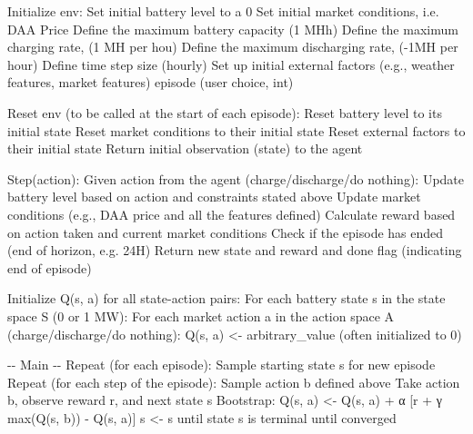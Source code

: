 \documentclass[11pt]{article}
\newenvironment{Shaded}{}{}
\newcommand{\NormalTok}[1]{{#1}}
\begin{document}
\begin{Shaded}
\begin{Highlighting}[]
\NormalTok{Initialize env:}
\NormalTok{    Set initial battery level to a 0}
\NormalTok{    Set initial market conditions, i.e. DAA Price}
\NormalTok{    Define the maximum battery capacity (1 MHh)}
\NormalTok{    Define the maximum charging rate, (1 MH per hou)}
\NormalTok{    Define the maximum discharging rate, ({-}1MH per hour)}
\NormalTok{    Define time step size (hourly)}
\NormalTok{    Set up initial external factors (e.g., weather features, market features)}
\NormalTok{    episode (user choice, int)}

\NormalTok{Reset env (to be called at the start of each episode): }
\NormalTok{    Reset battery level to its initial state}
\NormalTok{    Reset market conditions to their initial state}
\NormalTok{    Reset external factors to their initial state}
\NormalTok{    Return initial observation (state) to the agent}

\NormalTok{Step(action):}
\NormalTok{    Given action from the agent (charge/discharge/do nothing):}
\NormalTok{        Update battery level based on action and constraints stated above}
\NormalTok{        Update market conditions (e.g., DAA price and all the features defined)}
\NormalTok{        Calculate reward based on action taken and current market conditions}
\NormalTok{        Check if the episode has ended (end of horizon, e.g. 24H)}
\NormalTok{        Return new state and reward and done flag (indicating end of episode)}

\NormalTok{Initialize Q(s, a) for all state{-}action pairs:}
\NormalTok{    For each battery state s in the state space S (0 or 1 MW):}
\NormalTok{        For each market action a in the action space A (charge/discharge/do nothing):}
\NormalTok{            Q(s, a) \textless{}{-} arbitrary\_value (often initialized to 0)}

\NormalTok{{-}{-} Main {-}{-}}
\NormalTok{Repeat (for each episode):}
\NormalTok{    Sample starting state s for new episode}
\NormalTok{    Repeat (for each step of the episode):}
\NormalTok{        Sample action b defined above}
\NormalTok{        Take action b, observe reward r, and next state s\textquotesingle{}}
\NormalTok{        Bootstrap: Q(s, a) \textless{}{-} Q(s, a) + α [r + γ max(Q(s\textquotesingle{}, b)) {-} Q(s, a)]}
\NormalTok{        s \textless{}{-} s\textquotesingle{}}
\NormalTok{    until state s is terminal}
\NormalTok{until converged}
\end{Highlighting}
\end{Shaded}
\end{document}
